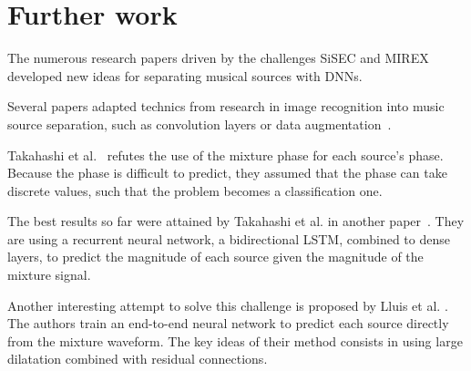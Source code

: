 \section{Further work}
\label{sec:related}

The numerous research papers driven by the challenges SiSEC and MIREX
developed new ideas for separating musical sources with DNNs.

Several papers adapted technics from research in image recognition
into music source separation, such as convolution
layers \cite{chandna2017monoaural} or data augmentation~\cite{uhlich2017improving}.

Takahashi et al.~\cite{takahashi2018phasenet} refutes the use of the mixture phase for each source's
phase. Because the phase is difficult to predict, they assumed that the phase
can take discrete values, such that the problem becomes a classification one.

The best results so far were attained by Takahashi et al. in another paper~\cite{takahashi2018mmdenselstm}.
They are using a recurrent neural network, a bidirectional LSTM, combined to
dense layers, to predict the magnitude of each source given the magnitude of the
mixture signal.

Another interesting attempt to solve this challenge is proposed by Lluis et al.
\cite{lluis2018end}. The authors train an end-to-end neural network to predict each source
directly from the mixture waveform. The key ideas of their method consists in
using large dilatation combined with residual connections.
